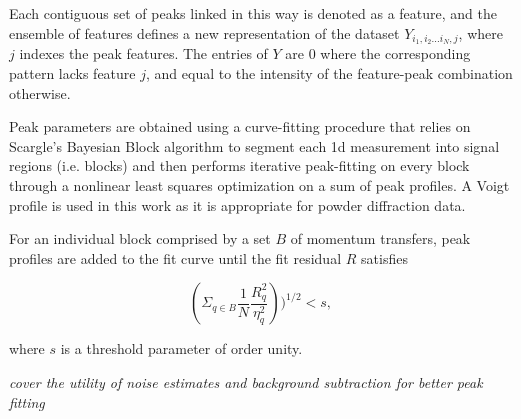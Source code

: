 \documentclass[12pt]{iopart}
\begin{document}
Each contiguous set of peaks linked in this way is denoted as a feature, and the ensemble of features defines a new representation of the dataset $ Y_{i_1,i_2...i_N, j} $, where $j$ indexes the peak features. The entries of $Y$ are 0 where the corresponding pattern lacks feature $j$, and equal to the intensity of the feature-peak combination otherwise.

Peak parameters are obtained using a curve-fitting procedure that relies on Scargle's Bayesian Block algorithm to segment each 1d measurement into signal regions (i.e. blocks) and then performs iterative peak-fitting on every block through a nonlinear least squares optimization on a sum of peak profiles. A Voigt profile is used in this work as it is appropriate for powder diffraction data. 

For an individual block comprised by a set $B$ of momentum transfers, peak profiles are added to the fit curve until the fit residual $R$ satisfies

\begin{equation}
(\Sigma_{q \in B}\frac{1}{N}\frac{R_q^2}{\eta_{q}^2}))^{1 / 2}  < s,
\end{equation}

where $s$ is a threshold parameter of order unity.%

\emph{cover the utility of noise estimates and background subtraction for better peak fitting}
\end{document}
